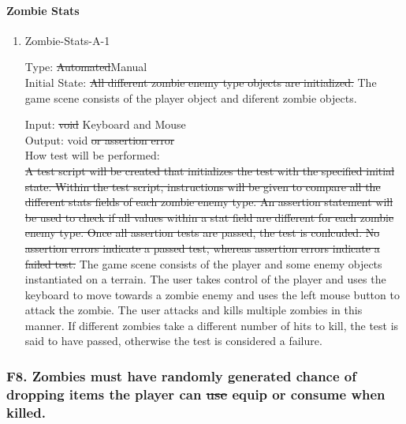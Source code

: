 \documentclass[12pt, titlepage]{article}
\DeclareRobustCommand{\hsout}[1]{\texorpdfstring{\sout{#1}}{#1}}
\newcounter{ftnum}
\begin{document}
\paragraph{Zombie Stats}

\begin{enumerate}

\item{Zombie-Stats-A-1\\}  \label{F7-1}

Type: \hsout{Automated}{\color{magenta}Manual}\\
					
Initial State: \hsout{All different zombie enemy type objects are initialized.} {\color{magenta} The game scene consists of the player object and diferent zombie objects.}
					
Input: \hsout{void } {\color{magenta} Keyboard and Mouse}\\
					
Output: void \hsout{or assertion error} \\
					
How test will be performed:\\ \hsout{A test script will be created that initializes the test with the specified initial state. Within the test script, instructions will be given to compare all the different stats fields of each zombie enemy type. An assertion statement will be used to check if all values within a stat field are different for each zombie enemy type. Once all assertion tests are passed, the test is conlcuded. No assertion errors indicate a passed test, whereas assertion errors indicate a failed test.}
{\color{magenta} The game scene consists of the player and some enemy objects instantiated on a terrain. The user takes control of the player and uses the keyboard to move towards a zombie enemy and uses the left mouse button to attack the zombie. The user attacks and kills multiple zombies in this manner. If different zombies take a different number of hits to kill, the test is said to have passed, otherwise the test is considered a failure.}\\

\end{enumerate}

\subsubsection{{\color{magenta} F8.} Zombies must have randomly generated chance of dropping items the player can \hsout{use} {\color{magenta} equip} or consume when killed.} 
\end{document}
